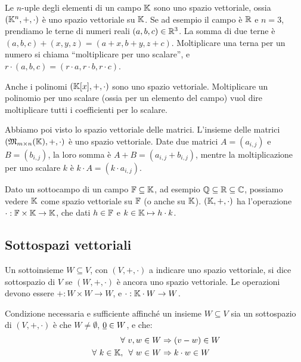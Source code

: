 Le $n$-uple degli elementi di un campo $\mathbb{K}$ sono uno spazio vettoriale, ossia $(\mathbb{K}^n, +, \cdot)$ \`e uno spazio vettoriale su $\mathbb{K}$. Se ad esempio il campo \`e $\mathbb{R}$ e $n = 3$, prendiamo le terne di numeri reali $(a,b,c) \in \mathbb{R}^3$. La somma di due terne \`e $(a,b,c) + (x,y,z) = (a + x, b + y, z + c)$. Moltiplicare una terna per un numero si chiama ``moltiplicare per uno scalare'', e $r \cdot (a,b,c) = (r \cdot a, r \cdot b, r \cdot c)$.

Anche i polinomi $(\mathbb{K}[x], +, \cdot)$ sono uno spazio vettoriale. Moltiplicare un polinomio per uno scalare (ossia per un elemento del campo) vuol dire moltiplicare tutti i coefficienti per lo scalare.

Abbiamo poi visto lo spazio vettoriale delle matrici. L'insieme delle matrici $(\mathfrak{M}_{m \times n} (\mathbb{K}), +, \cdot)$ \`e uno spazio vettoriale. Date due matrici $A = (a_{i,j})$ e $B = (b_{i,j})$, la loro somma \`e $A + B = (a_{i,j} + b_{i,j})$, mentre la moltiplicazione per uno scalare $k$ \`e $k \cdot A = (k \cdot a_{i,j})$.

Dato un sottocampo di un campo $\mathbb{F} \subseteq \mathbb{K}$, ad esempio $\mathbb{Q} \subseteq \mathbb{R} \subseteq \mathbb{C}$, possiamo vedere $\mathbb{K}$ come spazio vettoriale su $\mathbb{F}$ (o anche su $\mathbb{K}$). $(\mathbb{K}, +, \cdot)$ ha l'operazione $\cdot : \mathbb{F} \times \mathbb{K} \to \mathbb{K}$, che dati $h \in \mathbb{F}$ e $ k \in \mathbb{K} \mapsto h \cdot k$.

\subsection{Sottospazi vettoriali}

Un sottoinsieme $W \subseteq V$, con $(V, +, \cdot)$ a indicare uno spazio vettoriale, si dice sottospazio di $V$ se $(W, +, \cdot)$ \`e ancora uno spazio vettoriale. Le operazioni devono essere $+ : W \times W \to W$, e $\cdot : \mathbb{K} \cdot W \to W$.

Condizione necessaria e sufficiente affinch\'e un insieme $W \subseteq V$ sia un sottospazio di $(V, +, \cdot)$ \`e che $W \neq \emptyset$, $\underline{0} \in W$, e che:
\begin{align*}
\forall v, w \in W &\implies (v - w) \in W \\
\forall k \in \field , \, \forall w \in W &\implies k \cdot w \in W
\end{align*}


